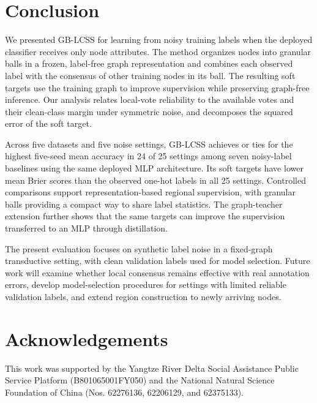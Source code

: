 \documentclass[10pt,letterpaper,nopreprintline]{elsarticle}
\theoremstyle{plain}
\begin{document}
\section{Conclusion}\label{sec:5}

We presented GB-LCSS for learning from noisy training labels when the deployed classifier receives only node attributes. The method organizes nodes into granular balls in a frozen, label-free graph representation and combines each observed label with the consensus of other training nodes in its ball. The resulting soft targets use the training graph to improve supervision while preserving graph-free inference. Our analysis relates local-vote reliability to the available votes and their clean-class margin under symmetric noise, and decomposes the squared error of the soft target.

Across five datasets and five noise settings, GB-LCSS achieves or ties for the highest five-seed mean accuracy in 24 of 25 settings among seven noisy-label baselines using the same deployed MLP architecture. Its soft targets have lower mean Brier scores than the observed one-hot labels in all 25 settings. Controlled comparisons support representation-based regional supervision, with granular balls providing a compact way to share label statistics. The graph-teacher extension further shows that the same targets can improve the supervision transferred to an MLP through distillation.

The present evaluation focuses on synthetic label noise in a fixed-graph transductive setting, with clean validation labels used for model selection. Future work will examine whether local consensus remains effective with real annotation errors, develop model-selection procedures for settings with limited reliable validation labels, and extend region construction to newly arriving nodes.

\FloatBarrier

\section*{Acknowledgements}

This work was supported by the Yangtze River Delta Social Assistance Public Service Platform (B801065001FY050) and the National Natural Science Foundation of China (Nos. 62276136, 62206129, and 62375133).

\setlength{\bibsep}{0.5pt plus 0.2pt minus 0.2pt}



\end{document}
